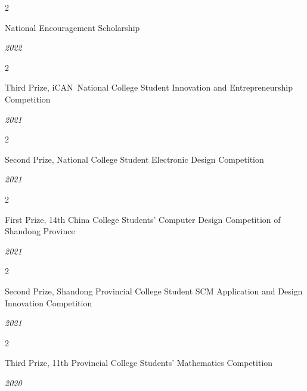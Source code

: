 \documentclass[10pt, letterpaper]{article}
\newcommand{\entrydate}[1]{%
    {\small\itshape #1}%
}
\newenvironment{twocolentry}[2][]{
    \onecolentry
    \def\secondColumn{#2}
    \setcolumnwidth{\fill,4cm}
    \begin{paracol}{2}
}{
    \switchcolumn
    \raggedleft
    \secondColumn
    \end{paracol}
    \endonecolentry
}
\begin{document}
\vspace{0.08cm}

\begin{twocolentry}{\entrydate{2022}}
    National Encouragement Scholarship
\end{twocolentry}

\vspace{0.08cm}

\begin{twocolentry}{\entrydate{2021}}
    Third Prize, \textquotedbl iCAN\textquotedbl\ National College Student Innovation and Entrepreneurship Competition
\end{twocolentry}

\vspace{0.08cm}

\begin{twocolentry}{\entrydate{2021}}
    Second Prize, National College Student Electronic Design Competition
\end{twocolentry}

\vspace{0.08cm}

\begin{twocolentry}{\entrydate{2021}}
    First Prize, 14th China College Students' Computer Design Competition of Shandong Province
\end{twocolentry}

\vspace{0.08cm}

\begin{twocolentry}{\entrydate{2021}}
    Second Prize, Shandong Provincial College Student SCM Application and Design Innovation Competition
\end{twocolentry}

\vspace{0.08cm}

\begin{twocolentry}{\entrydate{2020}}
    Third Prize, 11th Provincial College Students' Mathematics Competition
\end{twocolentry}
\end{document}
